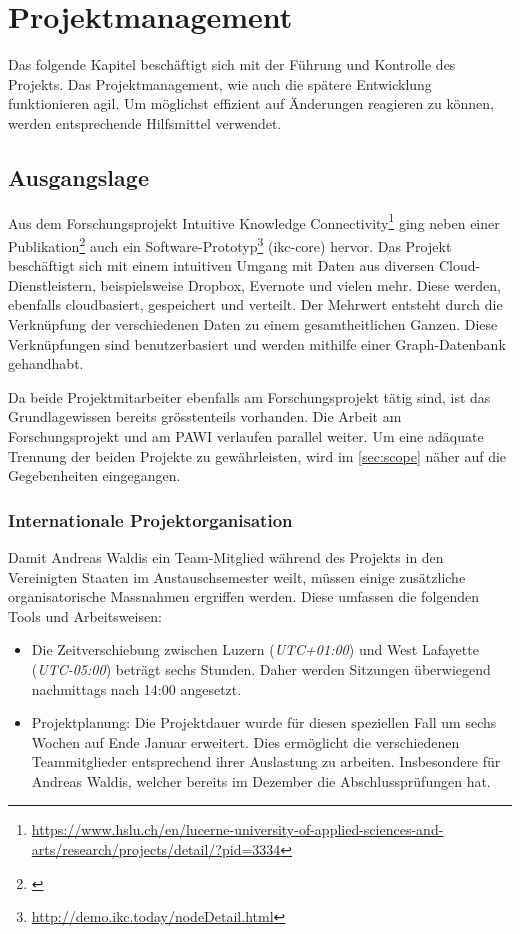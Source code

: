 \chapter{Projektmanagement}

Das folgende Kapitel beschäftigt sich mit der Führung und Kontrolle des Projekts. Das Projektmanagement, wie auch die spätere Entwicklung funktionieren agil. Um möglichst effizient auf Änderungen reagieren zu können, werden entsprechende Hilfsmittel verwendet.

\section{Ausgangslage}
Aus dem Forschungsprojekt \gls{Intuitive Knowledge Connectivity}\footnote{\url{https://www.hslu.ch/en/lucerne-university-of-applied-sciences-and-arts/research/projects/detail/?pid=3334}} ging neben einer Publikation\footnote{\citep{ikcpaper:hslu}} auch ein Software-Prototyp\footnote{\url{http://demo.ikc.today/nodeDetail.html}} (\gls{ikc-core}) hervor. Das Projekt beschäftigt sich mit einem intuitiven Umgang mit Daten aus diversen Cloud-Dienstleistern, beispielsweise \gls{Dropbox}, \gls{Evernote} und vielen mehr. Diese werden, ebenfalls \gls{cloudbasiert}, gespeichert und verteilt. Der Mehrwert entsteht durch die Verknüpfung der verschiedenen Daten zu einem gesamtheitlichen Ganzen. Diese Verknüpfungen sind be\-nutzer\-bas\-iert und werden mithilfe einer Graph-Datenbank gehandhabt.

Da beide Projektmitarbeiter ebenfalls am Forschungsprojekt tätig sind, ist das Grundlagewissen bereits grösstenteils vorhanden. Die Arbeit am Forschungsprojekt und am \gls{PAWI} verlaufen parallel weiter. Um eine adäquate Trennung der beiden Projekte zu gewährleisten, wird im \autoref{sec:scope} näher auf die Gegebenheiten eingegangen.

\subsection{Internationale Projektorganisation}
\label{subsec:international}
Damit Andreas Waldis ein Team-Mitglied während des Projekts in den Vereinigten Staaten im Austauschsemester weilt, müssen einige zusätzliche organisatorische Massnahmen ergriffen werden. Diese umfassen die folgenden Tools und Arbeitsweisen:
\begin{itemize}
\item Die Zeitverschiebung zwischen Luzern (\textit{UTC+01:00}) und West Lafayette (\textit{UTC-05:00}) beträgt sechs Stunden. Daher werden Sitzungen überwiegend nachmittags nach 14:00 angesetzt. 
\item Projektplanung: Die Projektdauer wurde für diesen speziellen Fall um sechs Wochen auf Ende Januar erweitert. Dies ermöglicht die verschiedenen Teammitglieder entsprechend ihrer Auslastung zu arbeiten. Insbesondere für Andreas Waldis, welcher bereits im Dezember die Abschlussprüfungen hat. 
\end{itemize}

